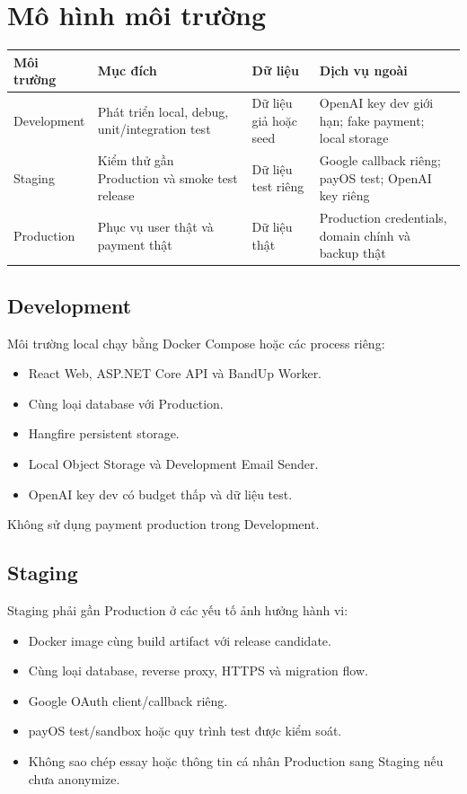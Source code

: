 \documentclass[11pt,a4paper]{article}
\begin{document}
\section{Mô hình môi trường}

\begin{longtable}{L{0.18\textwidth}L{0.27\textwidth}L{0.24\textwidth}L{0.23\textwidth}}
\toprule
\textbf{Môi trường} & \textbf{Mục đích} & \textbf{Dữ liệu} & \textbf{Dịch vụ ngoài} \\
\midrule
Development & Phát triển local, debug, unit/integration test & Dữ liệu giả hoặc seed & OpenAI key dev giới hạn; fake payment; local storage \\
Staging & Kiểm thử gần Production và smoke test release & Dữ liệu test riêng & Google callback riêng; payOS test; OpenAI key riêng \\
Production & Phục vụ user thật và payment thật & Dữ liệu thật & Production credentials, domain chính và backup thật \\
\bottomrule
\end{longtable}

\subsection{Development}

Môi trường local chạy bằng Docker Compose hoặc các process riêng:

\begin{itemize}
  \item React Web, ASP.NET Core API và BandUp Worker.
  \item Cùng loại database với Production.
  \item Hangfire persistent storage.
  \item Local Object Storage và Development Email Sender.
  \item OpenAI key dev có budget thấp và dữ liệu test.
\end{itemize}

Không sử dụng payment production trong Development.

\subsection{Staging}

Staging phải gần Production ở các yếu tố ảnh hưởng hành vi:

\begin{itemize}
  \item Docker image cùng build artifact với release candidate.
  \item Cùng loại database, reverse proxy, HTTPS và migration flow.
  \item Google OAuth client/callback riêng.
  \item payOS test/sandbox hoặc quy trình test được kiểm soát.
  \item Không sao chép essay hoặc thông tin cá nhân Production sang Staging nếu chưa anonymize.
\end{itemize}
\end{document}
